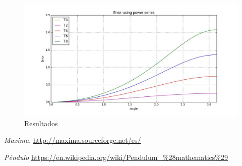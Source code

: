 \documentclass[12pt]{article}
\begin{document}
\begin{figure}[H]
	\centering
	\includegraphics[width=12cm]{p.png}
	\caption{Resultados}
\end{figure}

\begin{thebibliography}{6}
	
	\emph{Maxima}. 
	\url{http://maxima.sourceforge.net/es/}
	

	\emph{Péndulo}
	\url{https://en.wikipedia.org/wiki/Pendulum_%28mathematics%29}
	
\end{thebibliography}
\end{document}
